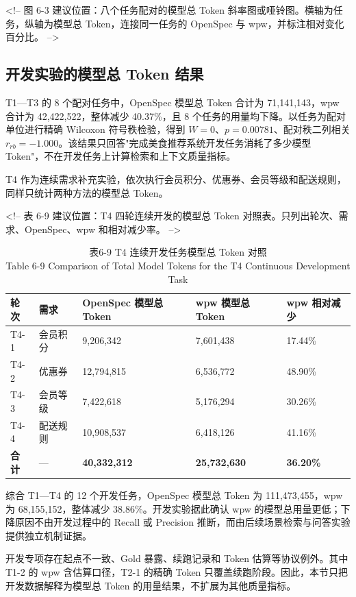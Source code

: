 <!-- 图 6-3 建议位置：八个任务配对的模型总 Token 斜率图或哑铃图。横轴为任务，纵轴为模型总 Token，连接同一任务的 OpenSpec 与 wpw，并标注相对变化百分比。 -->


\subsection{开发实验的模型总 Token 结果}
T1—T3 的 8 个配对任务中，OpenSpec 模型总 Token 合计为 71,141,143，wpw 合计为 42,422,522，整体减少 40.37\%，且 8 个任务的用量均下降。以任务为配对单位进行精确 Wilcoxon 符号秩检验，得到 $W=0$、$p=0.00781$、配对秩二列相关 $r_{rb}=-1.000$。该结果只回答"完成美食推荐系统开发任务消耗了多少模型 Token"，不在开发任务上计算检索和上下文质量指标。

T4 作为连续需求补充实验，依次执行会员积分、优惠券、会员等级和配送规则，同样只统计两种方法的模型总 Token。

<!-- 表 6-9 建议位置：T4 四轮连续开发的模型总 Token 对照表。只列出轮次、需求、OpenSpec、wpw 和相对减少率。 -->

\begin{table}[htbp]
\centering
\small
\caption{表6-9 T4 连续开发任务模型总 Token 对照\\Table 6-9 Comparison of Total Model Tokens for the T4 Continuous Development Task}
\begin{tabularx}{\textwidth}{|X|X|X|X|X|}
\hline
\textbf{轮次} & \textbf{需求} & \textbf{OpenSpec 模型总 Token} & \textbf{wpw 模型总 Token} & \textbf{wpw 相对减少} \\
\hline
T4-1 & 会员积分 & 9,206,342 & 7,601,438 & 17.44\% \\
T4-2 & 优惠券 & 12,794,815 & 6,536,772 & 48.90\% \\
T4-3 & 会员等级 & 7,422,618 & 5,176,294 & 30.26\% \\
T4-4 & 配送规则 & 10,908,537 & 6,418,126 & 41.16\% \\
\textbf{合计} & — & \textbf{40,332,312} & \textbf{25,732,630} & \textbf{36.20\%} \\
\hline
\end{tabularx}
\end{table}

综合 T1—T4 的 12 个开发任务，OpenSpec 模型总 Token 为 111,473,455，wpw 为 68,155,152，整体减少 38.86\%。开发实验据此确认 wpw 的模型总用量更低；下降原因不由开发过程中的 Recall 或 Precision 推断，而由后续场景检索与问答实验提供独立机制证据。

开发专项存在起点不一致、Gold 暴露、续跑记录和 Token 估算等协议例外。其中 T1-2 的 wpw 含估算口径，T2-1 的精确 Token 只覆盖续跑阶段。因此，本节只把开发数据解释为模型总 Token 的用量结果，不扩展为其他质量指标。

